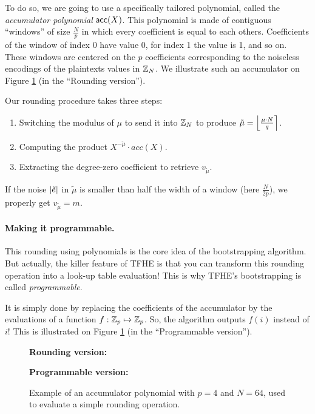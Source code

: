 To do so, we are going to use a specifically tailored polynomial, called the \textit{accumulator polynomial} $\textsf{acc}(X)$. This polynomial is made of contiguous ``windows'' of size $\frac N p$ in which every coefficient is equal to each others. Coefficients of the window of index 0 have value 0, for index 1 the value is 1, and so on. These windows are centered on the $p$ coefficients corresponding to the noiseless encodings of the plaintexts values in $\mathbb{Z}_N$. We illustrate such an accumulator on Figure \ref{fig:illustration_accumulator} (in the ``Rounding version'').



Our rounding procedure takes three steps:

\begin{enumerate}%
	\item Switching the modulus of $\mu$ to send it into $\mathbb{Z}_N$ to produce $\tilde \mu = \left \lfloor \frac{\mu \cdot N}{q} \right \rceil$.
	\item Computing the product $X^{- \tilde \mu} \cdot acc(X)$.
	\item Extracting the degree-zero coefficient to retrieve $v_{\tilde \mu}$.
\end{enumerate}

If the noise $\left \lvert \tilde e \right \rvert$ in $\tilde \mu$ is smaller than half the width of a window (here $\frac{N}{2p}$), we properly get $v_{\tilde \mu} = m$. 

\paragraph{Making it programmable.}
This rounding using polynomials is the core idea of the bootstrapping algorithm. But actually, the killer feature of TFHE is that you can transform this rounding operation into a look-up table evaluation! This is why TFHE's bootstrapping is called \textit{programmable}.

It is simply done by replacing the coefficients of the accumulator by the evaluations of a function $f:\mathbb{Z}_p \mapsto \mathbb{Z}_p$. So, the algorithm outputs $f(i)$ instead of $i$! This is illustrated on Figure \ref{fig:illustration_accumulator} (in the ``Programmable version'').


\begin{figure}
	\centering
	
	
	\vspace{1.5em}
	
	\textbf{Rounding version:}\\[0.5em]
	
	\vspace{1.5em}
	
	\textbf{Programmable version:}\\[0.5em]
	
	\caption{Example of an accumulator polynomial with $p=4$ and $N=64$, used to evaluate a simple rounding operation.}
	\label{fig:illustration_accumulator}
\end{figure}


